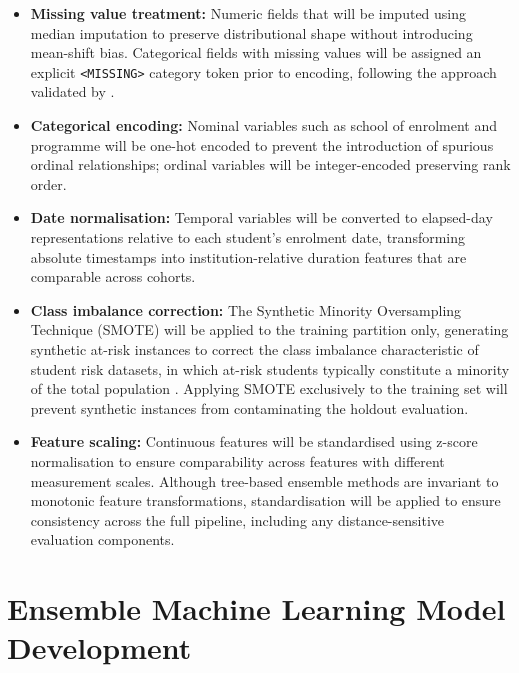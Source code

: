 \documentclass[12pt]{report}
\begin{document}
\begin{itemize}
    \item \textbf{Missing value treatment:} Numeric fields that will be imputed using
    median imputation to preserve distributional shape without introducing
    mean-shift bias. Categorical fields with missing values will be assigned an
    explicit \texttt{<MISSING>} category token prior to encoding, following
    the approach validated by \parencite{bettahi2025}.

    \item \textbf{Categorical encoding:} Nominal variables such as school of
    enrolment and programme will be one-hot encoded to prevent the
    introduction of spurious ordinal relationships; ordinal variables will be
    integer-encoded preserving rank order.

    \item \textbf{Date normalisation:} Temporal variables will be converted to
    elapsed-day representations relative to each student's enrolment date,
    transforming absolute timestamps into institution-relative duration
    features that are comparable across cohorts.

    \item \textbf{Class imbalance correction:} The Synthetic Minority
    Oversampling Technique (SMOTE) \parencite{chawla2002smote} will be applied
    to the training partition only, generating synthetic at-risk instances to
    correct the class imbalance characteristic of student risk datasets, in
    which at-risk students typically constitute a minority of the total
    population \parencite{hassen2020, bettahi2025}. Applying
    SMOTE exclusively to the training set will prevent synthetic instances from
    contaminating the holdout evaluation.

    \item \textbf{Feature scaling:} Continuous features will be standardised using
    z-score normalisation to ensure comparability across features with
    different measurement scales. Although tree-based ensemble methods are
    invariant to monotonic feature transformations, standardisation will be
    applied to ensure consistency across the full pipeline, including any
    distance-sensitive evaluation components.
\end{itemize}

\section{Ensemble Machine Learning Model Development}
\end{document}
